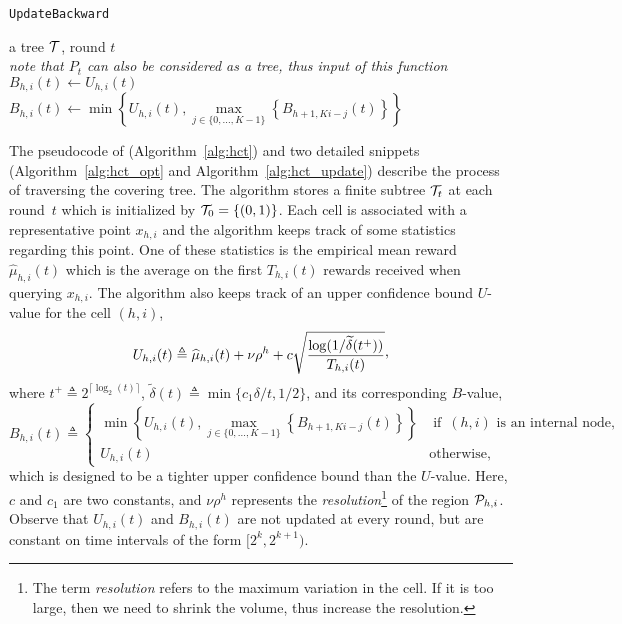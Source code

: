 \begin{algorithm}[ht]
\centering
\caption{\texttt{UpdateBackward} \label{alg:hct_update}}
\begin{algorithmic}[1]
     a tree $\mathcal{T}$, round $t$ \\ \hfil \emph{note that $P_t$ can also be considered as a tree, thus input of this function}
            \State $B_{h,i}(t) \gets U_{h,i}(t)$
        \Else 
            \State $B_{h,i}(t) \gets \min\left\{U_{h,i}(t),\underset{j\in\{0,\ldots,K-1\}}{\max} \left\{B_{h+1,Ki-j}(t)\right\} \right\}$
        \EndIf
    \EndFor
\end{algorithmic}
\end{algorithm}

The pseudocode of \HCT (Algorithm~\ref{alg:hct}) and two detailed snippets (Algorithm~\ref{alg:hct_opt} and Algorithm~\ref{alg:hct_update}) describe the process of traversing the covering tree.
The algorithm stores a finite subtree $\mathcal{T}_t$ at each round~$t$ which is initialized by $\mathcal{T}_0 = \{(0,1)\}$. Each cell is associated with a representative point $x_{h,i}$ and the algorithm keeps track of some statistics regarding this point. One of these statistics is the empirical mean reward $\hat{\mu}_{h,i}(t)$ which is the average on the first $T_{h,i}(t)$ rewards received when querying $x_{h,i}$.
The \HCT algorithm also keeps track of an upper confidence bound $U$-value for the cell $(h,i)$,
\[
	U_{h,i}(t) \triangleq \hat{\mu}_{h,i}(t) + \nu\rho^{h} + c\sqrt{\frac{\operatorname{log}(1/\tilde{\delta}(t^+))}{T_{h,i}(t)}}\CommaBin
\]
where $t^+\triangleq2^{\lceil \operatorname{log}_2(t) \rceil}$, $\tilde{\delta}(t)\triangleq\min\{c_1\delta/t,1/2\}$, and its corresponding $B$-value,
\begin{equation*}
	B_{h,i}(t) \triangleq
	\left\{ \begin{array}{ll}
				\min\left\{U_{h,i}(t),\underset{j\in\{0,\ldots,K-1\}}{\max} \left\{B_{h+1,Ki-j}(t)\right\} \right\} & \operatorname{if}~(h,i) \text{ is an internal node,}\\
				U_{h,i}(t) & \operatorname{otherwise,}
			\end{array}\right.
\end{equation*}
which is designed to be a tighter upper confidence bound than the $U$-value. Here, $c$ and $c_1$ are two constants, and $\nu\rho^h$ represents the \emph{resolution}\footnote{The term \emph{resolution} refers to the maximum variation in the cell. If it is too large, then we need to shrink the volume, thus increase the resolution.} of the region $\mathcal{P}_{h,i}$. Observe that $U_{h,i}(t)$ and $B_{h,i}(t)$ are not updated at every round, but are constant on time intervals of the form $[2^k,2^{k+1})$.

